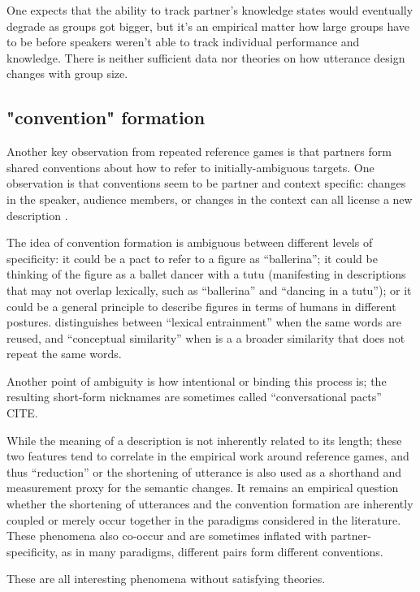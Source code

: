\documentclass[]{article}
\begin{document}
One expects that the ability to track partner's knowledge states would eventually degrade as groups got bigger, but it's an empirical matter how large groups have to be before speakers weren't able to track individual performance and knowledge. There is neither sufficient data nor theories on how utterance design changes with group size. 


\subsection{"convention" formation}
Another key observation from repeated reference games is that partners form shared conventions about how to refer to initially-ambiguous targets. One observation is that conventions seem to be partner and context specific: changes in the speaker, audience members, or changes in the context can all license a new description \cite{metzing2003a, ibarra2016, yoon2014}.

The idea of convention formation is ambiguous between different levels of specificity: it could be a pact to refer to a figure as ``ballerina''; it could be thinking of the figure as a ballet dancer with a tutu (manifesting in descriptions that may not overlap lexically, such as ``ballerina'' and ``dancing in a tutu''); or it could be a general principle to describe figures in terms of humans in different postures. 
\cite{horton2002a} distinguishes between ``lexical entrainment'' when the same words are reused, and ``conceptual similarity'' when is a a broader similarity that does not repeat the same words. 

Another point of ambiguity is how intentional or binding this process is; the resulting short-form nicknames are sometimes called ``conversational pacts'' CITE. 

While the meaning of a description is not inherently related to its length; these two features tend to correlate in the empirical work around reference games, and thus ``reduction'' or the shortening of utterance is also used as a shorthand and measurement proxy for the semantic changes. It remains an empirical question whether the shortening of utterances and the convention formation are inherently coupled or merely occur together in the paradigms considered in the literature. These phenomena also co-occur and are sometimes inflated with partner-specificity, as in many paradigms, different pairs form different conventions. 

These are all interesting phenomena without satisfying theories. 
\end{document}
